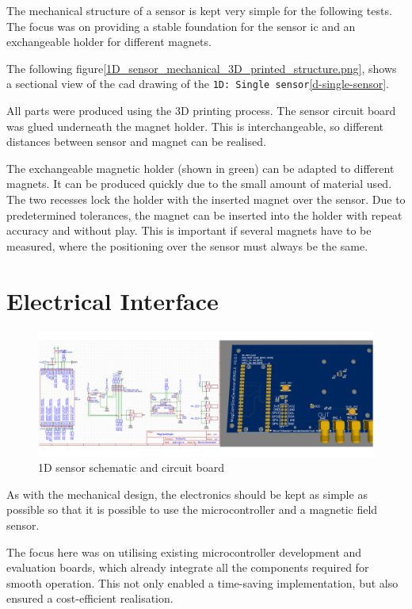 The mechanical structure of a sensor is kept very simple for the
following tests. The focus was on providing a stable foundation for the
sensor \gls{ic} and an exchangeable holder for different magnets.

The following figure\ref{1D_sensor_mechanical_3D_printed_structure.png},
shows a sectional view of the \gls{cad} drawing of the
\passthrough{\lstinline!1D: Single sensor!}\ref{d-single-sensor}.

All parts were produced using the 3D printing process. The sensor
circuit board was glued underneath the magnet holder. This is
interchangeable, so different distances between sensor and magnet can be
realised.

The exchangeable magnetic holder (shown in green) can be adapted to
different magnets. It can be produced quickly due to the small amount of
material used. The two recesses lock the holder with the inserted magnet
over the sensor. Due to predetermined tolerances, the magnet can be
inserted into the holder with repeat accuracy and without play. This is
important if several magnets have to be measured, where the positioning
over the sensor must always be the same.

\hypertarget{electrical-interface}{%
\section{Electrical Interface}\label{electrical-interface}}

\begin{figure}
\centering
\includegraphics{./generated_images/border_1D_sensor_schematic_and_circuit_board.png}
\caption{1D sensor schematic and circuit board
\label{1D_sensor_schematic_and_circuit_board.png}}
\end{figure}

As with the mechanical design, the electronics should be kept as simple
as possible so that it is possible to use the microcontroller and a
magnetic field sensor.

The focus here was on utilising existing microcontroller development and
evaluation boards, which already integrate all the components required
for smooth operation. This not only enabled a time-saving
implementation, but also ensured a cost-efficient realisation.


